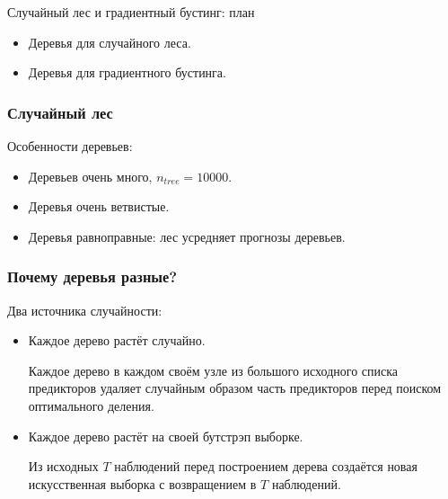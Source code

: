 
\begin{frame} %

  
  \end{frame}
  
  
  
  \begin{frame}{Случайный лес и градиентный бустинг: план}
    \begin{itemize}[<+->]
      \item Деревья для \alert{случайного леса}.
      \item Деревья для \alert{градиентного бустинга}.
    \end{itemize}
  
  \end{frame}
  

  \begin{frame}
    \frametitle{Случайный лес}

    Особенности деревьев:
    \begin{itemize}[<+->]
      \item Деревьев очень \alert{много}, $n_{tree} = 10000$.
      \item Деревья очень \alert{ветвистые}.
      \item Деревья равноправные: лес \alert{усредняет} прогнозы деревьев.  
    \end{itemize}
  \end{frame}

  \begin{frame}
    \frametitle{Почему деревья разные?}

      Два источника \alert{случайности}:
      \begin{itemize}[<+->]
        \item Каждое дерево растёт случайно. 
        
        Каждое дерево в \alert{каждом своём узле} из большого исходного списка предикторов 
        \alert{удаляет} случайным образом часть предикторов перед поиском оптимального деления. 

        \item Каждое дерево растёт на своей бутстрэп выборке. 
        
        Из исходных $T$ наблюдений перед построением дерева создаётся новая \alert{искусственная выборка с возвращением} 
        в $T$ наблюдений. 
      \end{itemize}
  \end{frame}


